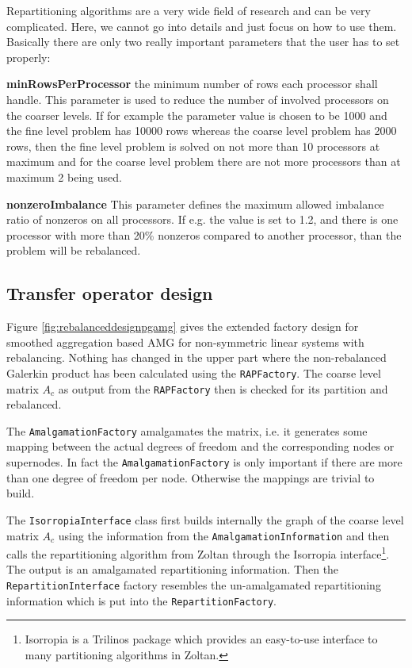 \documentclass[12pt,a4paper]{article}
\begin{document}
Repartitioning algorithms are a very wide field of research and can be very complicated. Here, we cannot go into details and just focus on how to use them. Basically there are only two really important parameters that the user has to set properly:
\begin{description}
\item \textbf{minRowsPerProcessor} the minimum number of rows each processor shall handle. This parameter is used to reduce the number of involved processors on the coarser levels. If for example the parameter value is chosen to be 1000 and the fine level problem has 10000 rows whereas the coarse level problem has 2000 rows, then the fine level problem is solved on not more than 10 processors at maximum and for the coarse level problem there are not more processors than at maximum 2 being used.
\item \textbf{nonzeroImbalance} This parameter defines the maximum allowed imbalance ratio of nonzeros on all processors. If e.g. the value is set to 1.2, and there is one processor with more than 20\% nonzeros compared to another processor, than the problem will be rebalanced.
\end{description}

\subsection{Transfer operator design}

Figure \ref{fig:rebalanceddesignpgamg} gives the extended factory design for smoothed aggregation based AMG for non-symmetric linear systems with rebalancing. Nothing has changed in the upper part where the non-rebalanced Galerkin product has been calculated using the \verb|RAPFactory|. The coarse level matrix $A_c$ as output from the \verb|RAPFactory| then is checked for its partition and rebalanced.

The \verb|AmalgamationFactory| amalgamates the matrix, i.e. it generates some mapping between the actual degrees of freedom and the corresponding nodes or supernodes. In fact the \verb|AmalgamationFactory| is only important if there are more than one degree of freedom per node. Otherwise the mappings are trivial to build.

The \verb|IsorropiaInterface| class first builds internally the graph of the coarse level matrix $A_c$ using the information from the \verb|AmalgamationInformation| and then calls the repartitioning algorithm from Zoltan through the Isorropia interface\footnote{Isorropia is a Trilinos package which provides an easy-to-use interface to many partitioning algorithms in Zoltan.}. The output is an amalgamated repartitioning information. Then the \verb|RepartitionInterface| factory resembles the un-amalgamated repartitioning information which is put into the \verb|RepartitionFactory|.
\end{document}
